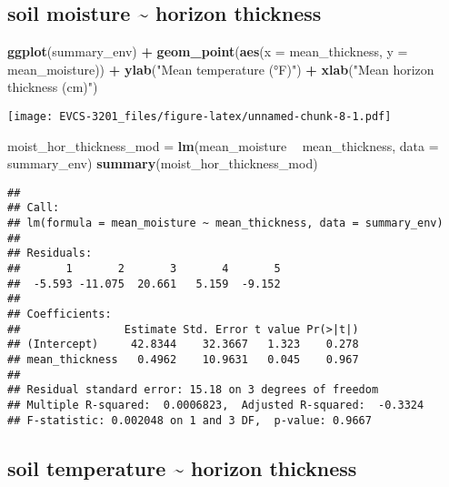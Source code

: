 \documentclass[]{book}
\newenvironment{Shaded}{\begin{snugshade}}{\end{snugshade}}
\newcommand{\KeywordTok}[1]{\textcolor[rgb]{0.13,0.29,0.53}{\textbf{#1}}}
\newcommand{\DataTypeTok}[1]{\textcolor[rgb]{0.13,0.29,0.53}{#1}}
\newcommand{\StringTok}[1]{\textcolor[rgb]{0.31,0.60,0.02}{#1}}
\newcommand{\OperatorTok}[1]{\textcolor[rgb]{0.81,0.36,0.00}{\textbf{#1}}}
\newcommand{\NormalTok}[1]{#1}
\begin{document}
\subsection*{soil moisture \textasciitilde{} horizon
thickness}\label{soil-moisture-horizon-thickness}

\begin{Shaded}
\begin{Highlighting}[]
\KeywordTok{ggplot}\NormalTok{(summary_env) }\OperatorTok{+}
\StringTok{  }\KeywordTok{geom_point}\NormalTok{(}\KeywordTok{aes}\NormalTok{(}\DataTypeTok{x =}\NormalTok{ mean_thickness, }\DataTypeTok{y =}\NormalTok{ mean_moisture)) }\OperatorTok{+}
\StringTok{  }\KeywordTok{ylab}\NormalTok{(}\StringTok{"Mean temperature (°F)"}\NormalTok{) }\OperatorTok{+}
\StringTok{  }\KeywordTok{xlab}\NormalTok{(}\StringTok{"Mean horizon thickness (cm)"}\NormalTok{)}
\end{Highlighting}
\end{Shaded}

\texttt{[image: EVCS-3201\_files/figure-latex/unnamed-chunk-8-1.pdf]}

\begin{Shaded}
\begin{Highlighting}[]
\NormalTok{moist_hor_thickness_mod =}\StringTok{ }\KeywordTok{lm}\NormalTok{(mean_moisture }\OperatorTok{~}\StringTok{ }\NormalTok{mean_thickness, }\DataTypeTok{data =}\NormalTok{ summary_env)}
\KeywordTok{summary}\NormalTok{(moist_hor_thickness_mod)}
\end{Highlighting}
\end{Shaded}

\begin{verbatim}
## 
## Call:
## lm(formula = mean_moisture ~ mean_thickness, data = summary_env)
## 
## Residuals:
##       1       2       3       4       5 
##  -5.593 -11.075  20.661   5.159  -9.152 
## 
## Coefficients:
##                Estimate Std. Error t value Pr(>|t|)
## (Intercept)     42.8344    32.3667   1.323    0.278
## mean_thickness   0.4962    10.9631   0.045    0.967
## 
## Residual standard error: 15.18 on 3 degrees of freedom
## Multiple R-squared:  0.0006823,  Adjusted R-squared:  -0.3324 
## F-statistic: 0.002048 on 1 and 3 DF,  p-value: 0.9667
\end{verbatim}

\subsection*{soil temperature \textasciitilde{} horizon
thickness}\label{soil-temperature-horizon-thickness}
\end{document}
